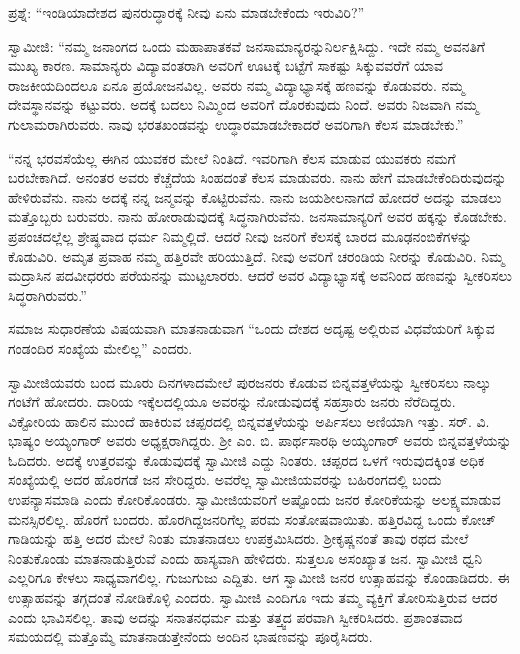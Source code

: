  ಪ್ರಶ್ನೆ: “ಇಂಡಿಯಾದೇಶದ ಪುನರುದ್ಧಾರಕ್ಕೆ ನೀವು ಏನು ಮಾಡಬೇಕೆಂದು ಇರುವಿರಿ?” 

 ಸ್ವಾಮೀಜಿ: “ನಮ್ಮ ಜನಾಂಗದ ಒಂದು ಮಹಾಪಾತಕವೆ ಜನಸಾಮಾನ್ಯರನ್ನು\break ನಿರ್ಲಕ್ಷಿಸಿದ್ದು. ಇದೇ ನಮ್ಮ ಅವನತಿಗೆ ಮುಖ್ಯ ಕಾರಣ. ಸಾಮಾನ್ಯರು ವಿದ್ಯಾವಂತರಾಗಿ ಅವರಿಗೆ ಊಟಕ್ಕೆ ಬಟ್ಟೆಗೆ ಸಾಕಷ್ಟು ಸಿಕ್ಕುವವರೆಗೆ ಯಾವ ರಾಜಕೀಯದಿಂದಲೂ ಏನೂ ಪ್ರಯೋಜನವಿಲ್ಲ. ಅವರು ನಮ್ಮ ವಿದ್ಯಾಭ್ಯಾಸಕ್ಕೆ ಹಣವನ್ನು ಕೊಡುವರು. ನಮ್ಮ ದೇವಸ್ಥಾನವನ್ನು ಕಟ್ಟುವರು. ಅದಕ್ಕೆ ಬದಲು ನಿಮ್ಮಿಂದ ಅವರಿಗೆ ದೊರಕುವುದು ನಿಂದೆ. ಅವರು ನಿಜವಾಗಿ ನಮ್ಮ ಗುಲಾಮರಾಗಿರುವರು. ನಾವು ಭರತಖಂಡವನ್ನು ಉದ್ಧಾರಮಾಡಬೇಕಾದರೆ ಅವರಿಗಾಗಿ ಕೆಲಸ ಮಾಡಬೇಕು.” 

 “ನನ್ನ ಭರವಸೆಯೆಲ್ಲ ಈಗಿನ ಯುವಕರ ಮೇಲೆ ನಿಂತಿದೆ. ಇವರಿಗಾಗಿ ಕೆಲಸ ಮಾಡುವ ಯುವಕರು ನಮಗೆ ಬರಬೇಕಾಗಿದೆ. ಅನಂತರ ಅವರು ಕೆಚ್ಚೆದೆಯ ಸಿಂಹದಂತೆ ಕೆಲಸ ಮಾಡುವರು. ನಾನು ಹೇಗೆ ಮಾಡಬೇಕೆಂದಿರುವುದನ್ನು ಹೇಳಿರುವೆನು. ನಾನು ಅದಕ್ಕೆ ನನ್ನ ಜನ್ಮವನ್ನು ಕೊಟ್ಟಿರುವೆನು. ನಾನು ಜಯಶೀಲನಾಗದೆ ಹೋದರೆ ಅದನ್ನು ಮಾಡಲು ಮತ್ತೊಬ್ಬರು ಬರುವರು. ನಾನು ಹೋರಾಡುವುದಕ್ಕೆ ಸಿದ್ಧನಾಗಿರುವೆನು. ಜನಸಾಮಾನ್ಯರಿಗೆ ಅವರ ಹಕ್ಕನ್ನು ಕೊಡಬೇಕು. ಪ್ರಪಂಚದಲ್ಲೆಲ್ಲ ಶ್ರೇಷ್ಥವಾದ ಧರ್ಮ ನಿಮ್ಮಲ್ಲಿದೆ. ಆದರೆ ನೀವು ಜನರಿಗೆ ಕೆಲಸಕ್ಕೆ ಬಾರದ ಮೂಢನಂಬಿಕೆಗಳನ್ನು ಕೊಡುವಿರಿ. ಅಮೃತ ಪ್ರವಾಹ ನಮ್ಮ ಹತ್ತಿರವೇ ಹರಿಯುತ್ತಿದೆ. ನೀವು ಅವರಿಗೆ ಚರಂಡಿಯ ನೀರನ್ನು ಕೊಡುವಿರಿ. ನಿಮ್ಮ ಮದ್ರಾಸಿನ ಪದವೀಧರರು ಪರೆಯನನ್ನು ಮುಟ್ಟಲಾರರು. ಆದರೆ ಅವರ ವಿದ್ಯಾಭ್ಯಾಸಕ್ಕೆ ಅವನಿಂದ ಹಣವನ್ನು ಸ್ವೀಕರಿಸಲು ಸಿದ್ಧರಾಗಿರುವರು.” 

 ಸಮಾಜ ಸುಧಾರಣೆಯ ವಿಷಯವಾಗಿ ಮಾತನಾಡುವಾಗ “ಒಂದು ದೇಶದ ಅದೃಷ್ಟ ಅಲ್ಲಿರುವ ವಿಧವೆಯರಿಗೆ ಸಿಕ್ಕುವ ಗಂಡಂದಿರ ಸಂಖ್ಯೆಯ ಮೇಲಿಲ್ಲ” ಎಂದರು. 

 ಸ್ವಾಮೀಜಿಯವರು ಬಂದ ಮೂರು ದಿನಗಳಾದಮೇಲೆ ಪುರಜನರು ಕೊಡುವ ಬಿನ್ನವತ್ತಳೆಯನ್ನು ಸ್ವೀಕರಿಸಲು ನಾಲ್ಕು ಗಂಟೆಗೆ ಹೋದರು. ದಾರಿಯ ಇಕ್ಕೆಲದಲ್ಲಿಯೂ ಅವರನ್ನು ನೋಡುವುದಕ್ಕೆ ಸಹಸ್ರಾರು ಜನರು ನೆರೆದಿದ್ದರು. ವಿಕ್ಟೋರಿಯ ಹಾಲಿನ ಮುಂದೆ ಹಾಕಿರುವ ಚಪ್ಪರದಲ್ಲಿ ಬಿನ್ನವತ್ತಳೆಯನ್ನು ಅರ್ಪಿಸಲು ಅಣಿಯಾಗಿ ಇತ್ತು. ಸರ್. ವಿ. ಭಾಷ್ಯಂ ಅಯ್ಯಂಗಾರ್ ಅವರು ಅಧ್ಯಕ್ಷರಾಗಿದ್ದರು. ಶ‍್ರೀ ಎಂ. ಬಿ. ಪಾರ್ಥಸಾರಥಿ ಅಯ್ಯಂಗಾರ್ ಅವರು ಬಿನ್ನವತ್ತಳೆಯನ್ನು ಓದಿದರು. ಅದಕ್ಕೆ ಉತ್ತರವನ್ನು ಕೊಡುವುದಕ್ಕೆ ಸ್ವಾಮೀಜಿ ಎದ್ದು ನಿಂತರು. ಚಪ್ಪರದ ಒಳಗೆ ಇರುವುದಕ್ಕಿಂತ ಅಧಿಕ ಸಂಖ್ಯೆಯಲ್ಲಿ ಅದರ ಹೊರಗಡೆ ಜನ ಸೇರಿದ್ದರು. ಅವರೆಲ್ಲ ಸ್ವಾಮೀಜಿಯವರನ್ನು ಬಹಿರಂಗದಲ್ಲಿ ಬಂದು ಉಪನ್ಯಾಸಮಾಡಿ ಎಂದು ಕೋರಿಕೊಂಡರು. ಸ್ವಾಮೀಜಿಯವರಿಗೆ ಅಷ್ಟೊಂದು ಜನರ ಕೋರಿಕೆಯನ್ನು ಅಲಕ್ಷ್ಯಮಾಡುವ ಮನಸ್ಸಿರಲಿಲ್ಲ. ಹೊರಗೆ ಬಂದರು. ಹೊರಗಿದ್ದ\break ಜನರಿಗೆಲ್ಲ ಪರಮ ಸಂತೋಷವಾಯಿತು. ಹತ್ತಿರವಿದ್ದ ಒಂದು ಕೋಚ್ ಗಾಡಿಯನ್ನು ಹತ್ತಿ ಅದರ ಮೇಲೆ ನಿಂತು ಮಾತನಾಡಲು ಉಪಕ್ರಮಿಸಿದರು. ಶ‍್ರೀಕೃಷ್ಣನಂತೆ ತಾವು ರಥದ ಮೇಲೆ ನಿಂತುಕೊಂಡು ಮಾತನಾಡುತ್ತಿರುವೆ ಎಂದು ಹಾಸ್ಯವಾಗಿ ಹೇಳಿದರು. ಸುತ್ತಲೂ ಅಸಂಖ್ಯಾತ ಜನ. ಸ್ವಾಮೀಜಿ ಧ್ವನಿ ಎಲ್ಲರಿಗೂ ಕೇಳಲು ಸಾಧ್ಯವಾಗಲಿಲ್ಲ. ಗುಜುಗುಜು ಎದ್ದಿತು. ಆಗ ಸ್ವಾಮೀಜಿ ಜನರ ಉತ್ಸಾಹವನ್ನು ಕೊಂಡಾಡಿದರು. ಈ ಉತ್ಸಾಹವನ್ನು ತಗ್ಗದಂತೆ ನೋಡಿಕೊಳ್ಳಿ ಎಂದರು. ಸ್ವಾಮೀಜಿ ಎಂದಿಗೂ ಇದು ತಮ್ಮ ವ್ಯಕ್ತಿಗೆ ತೋರಿಸುತ್ತಿರುವ ಆದರ ಎಂದು ಭಾವಿಸಲಿಲ್ಲ. ತಾವು ಅದನ್ನು ಸನಾತನಧರ್ಮ ಮತ್ತು ತತ್ತ್ವದ ಪರವಾಗಿ ಸ್ವೀಕರಿಸಿದರು. ಪ್ರಶಾಂತವಾದ ಸಮಯದಲ್ಲಿ ಮತ್ತೊಮ್ಮೆ ಮಾತನಾಡುತ್ತೇನೆಂದು ಅಂದಿನ ಭಾಷಣವನ್ನು ಪೂರೈಸಿದರು. 

